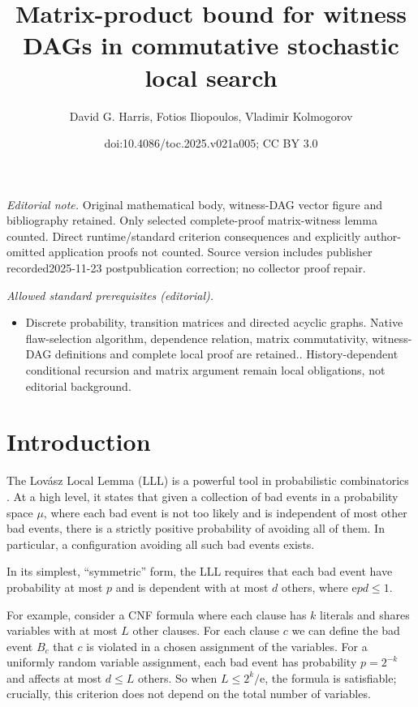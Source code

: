 \documentclass[11pt]{article}
\title{Matrix-product bound for witness DAGs in commutative stochastic local search}
\author{David G. Harris, Fotios Iliopoulos, Vladimir Kolmogorov}
\date{doi:10.4086/toc.2025.v021a005; CC BY 3.0}
\newcommand{\eee}{\mathrm e}
\begin{document}
\maketitle
\noindent\textit{Editorial note.} Original mathematical body, witness-DAG vector figure and bibliography retained. Only selected complete-proof matrix-witness lemma counted. Direct runtime/standard criterion consequences and explicitly author-omitted application proofs not counted. Source version includes publisher recorded2025-11-23 postpublication correction; no collector proof repair.\par\medskip
\noindent\textit{Allowed standard prerequisites (editorial).}\begin{itemize}
\item Discrete probability, transition matrices and directed acyclic graphs. Native flaw-selection algorithm, dependence relation, matrix commutativity, witness-DAG definitions and complete local proof are retained.. History-dependent conditional recursion and matrix argument remain local obligations, not editorial background.
\end{itemize}\medskip
\section{Introduction}
The Lov\'{a}sz Local Lemma  (LLL) is a powerful tool in probabilistic combinatorics \cite{LLL}. At a high level, it states that given a collection of bad events in a probability space $\mu$, where each bad event is  not too likely and is independent of most other bad events, there is a strictly positive probability of avoiding all of them. In particular, a configuration avoiding all such bad events exists. 

In its simplest, ``symmetric'' form, the LLL requires that each 
bad event %
%
%
%
%
have  %
probability at most $p$ and is dependent with at most $d$ others,
where $\eee p d \leq 1$.  

For example, consider a CNF formula where each clause has $k$ literals and shares variables with at most $L$ other clauses. For each clause $c$ we can define the bad event $B_c$ that $c$ is violated in a chosen assignment of the variables. For a uniformly random variable assignment, each bad event has probability $p = 2^{-k}$ and affects at most $d \leq L$ others. So when
%
%
$L \leq 2^k/\eee$,   %
the formula is satisfiable; crucially, this criterion does not depend on the total number of variables.
\end{document}
